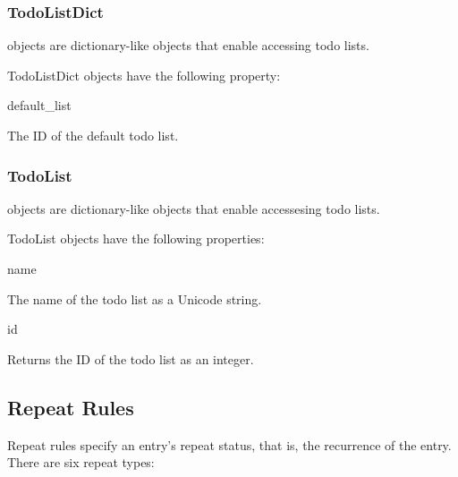 \subsubsection{TodoListDict}
\label{subsubsec:todolistdict}

 objects are dictionary-like objects that enable 
accessing todo lists. 

\begin{classdesc*}{TodoListDict}
 objects have the following property:

\begin{memberdesc}[TodoListDict]{default_list}

The ID of the default todo list.

\end{memberdesc}

\end{classdesc*}

\subsubsection{TodoList}
\label{subsubsec:todolist}

 objects are dictionary-like objects that enable 
accessesing todo lists. 

\begin{classdesc*}{TodoList}
 objects have the following properties:

\begin{memberdesc}[TodoList]{name}

The name of the todo list as a Unicode string.

\end{memberdesc}

\begin{memberdesc}[TodoList]{id}

Returns the ID of the todo list as an integer.

\end{memberdesc}

\end{classdesc*}

\subsection{Repeat Rules}
\label{subsec:repeat}

Repeat rules specify an entry's repeat status, that is, the recurrence of 
the entry. There are six repeat types: 

